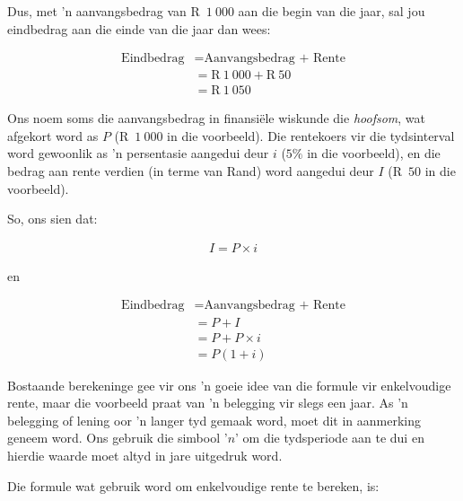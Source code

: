 Dus, met ’n aanvangsbedrag van R~$1~000$ aan die begin van die jaar, sal jou eindbedrag aan die einde van die jaar dan wees:\par 
\begin{align*}
    \mbox{Eindbedrag} &= \mbox{Aanvangsbedrag + Rente}\\
    &= \mbox{R}~1~000 + \mbox{R}~50\\
    &= \mbox{R}~1~050
\end{align*}

Ons noem soms die aanvangsbedrag in finansiële wiskunde die \textit{hoofsom}, wat afgekort word as $P$ (R~$1~000$ in die voorbeeld). Die rentekoers vir die tydsinterval word gewoonlik as ’n persentasie aangedui deur $i$ ($5\%$ in die voorbeeld),  en die bedrag aan rente verdien (in terme van Rand) word aangedui deur $I$ (R~$50$ in die voorbeeld).\par 

So, ons sien dat:
        
\begin{align*}
    I = P \times i
\end{align*}

en

\begin{align*}
    \mbox{Eindbedrag} &= \mbox{Aanvangsbedrag + Rente} \nonumber\\
    &= P + I \nonumber\\
    &= P + P \times i\nonumber\\
    &= P(1 + i)
\end{align*}



Bostaande berekeninge gee vir ons 'n goeie idee van die formule vir enkelvoudige rente, maar die voorbeeld praat van 'n belegging vir slegs een jaar. As 'n belegging of lening oor 'n langer tyd gemaak word, moet dit in aanmerking geneem word. Ons gebruik die simbool '$n$' om die tydsperiode aan te dui en hierdie waarde moet altyd in jare uitgedruk word.\par

Die formule wat gebruik word om enkelvoudige rente te bereken, is:





